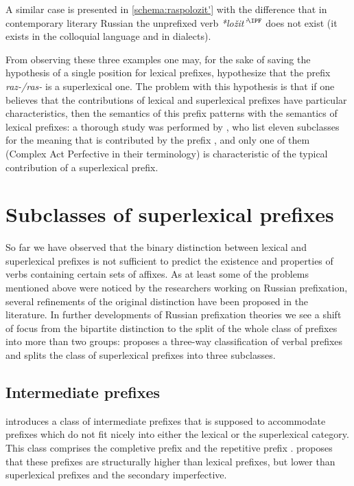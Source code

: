 A similar case is presented in \ref{schema:raspolozit'}
with the difference that in contemporary literary Russian the unprefixed verb \textit{*lo\v{z}it'}$^{\IPF}$ does not exist (it exists in the colloquial language and in dialects). 

From observing these three examples one may, for the sake of saving the hypothesis of a single position for lexical prefixes, hypothesize that the prefix \mbox{\textit{raz-/ras-}} is a superlexical one. The problem with this hypothesis is that if one believes that the contributions of lexical and superlexical prefixes have particular characteristics, then the semantics of this prefix patterns with the semantics of lexical prefixes: a thorough study was performed by \citet{JandaNesset:10}, who list eleven subclasses for the meaning that is contributed by the prefix , and only one of them (Complex Act Perfective in their terminology) is characteristic of the typical contribution of a superlexical prefix.


\section{Subclasses of superlexical prefixes}\label{section:subclasses}
So far we have observed that the binary distinction between lexical and superlexical prefixes is not sufficient to predict the existence and properties of verbs containing certain sets of affixes. As at least some of the problems mentioned above were noticed by the researchers working on Russian prefixation, several refinements of the original distinction have been proposed in the literature. In further developments of Russian prefixation theories we see a shift of focus from the bipartite distinction to the split of the whole class of prefixes into more than two groups: \citet{Tatevosov:07} proposes a three-way classification of verbal prefixes and \citet{Tatevosov:09} splits the class of superlexical prefixes into three subclasses.

\subsection{Intermediate prefixes}
\cite{Tatevosov:07} introduces a class of intermediate prefixes that is supposed to accommodate prefixes which do not fit nicely into either the lexical or the superlexical category. This class comprises the completive prefix  and the repetitive prefix . \citet{Tatevosov:07} proposes that these prefixes are structurally higher than lexical prefixes, but lower than superlexical prefixes and the secondary imperfective. 

